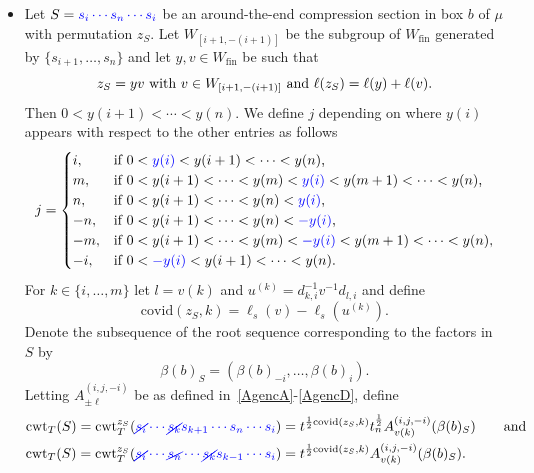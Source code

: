 \documentclass[11pt]{article}
\theoremstyle{plain}
\theoremstyle{definition}
\theoremstyle{remark}
\numberwithin{equation}{section}
\newcounter{r}
\newcounter{s}
\begin{document}
\begin{itemize}
\item[(CS1)] 
Let $S={\color{blue} s_i\cdots s_n\cdots s_{i}}$ be an around-the-end compression section in box $b$ of $\mu$ with permutation $z_S$.
Let $W_{[i+1,-(i+1)]}$ be the subgroup of $W_{\mathrm{fin}}$ generated by $\{s_{i+1}, \ldots, s_n\}$ 
and let $y,v\in W_{\mathrm{fin}}$ be such that
$$\hbox{$z_S = yv$ with $v\in W_{[i+1,-(i+1)]}$ and $\ell(z_S) = \ell(y)+\ell(v).$}$$
Then $0< y(i+1) < \cdots < y(n)$. We define $j$ depending on where $y(i)$ appears with respect to the other entries as follows
$$j = \begin{cases}
i, &\hbox{if $0<{\color{blue} y(i)} < y(i+1)<\cdots < y(n)$, } \\
m, &\hbox{if $0<y(i+1)<\cdots < y(m)  < {\color{blue} y(i) } < y(m+1) < \cdots < y(n)$,} \\
n, &\hbox{if $0<y(i+1)<\cdots  <y(n)< {\color{blue} y(i)}$,} \\
-n, &\hbox{if $0<y(i+1)<\cdots  <y(n)< {\color{blue} -y(i)}$,} \\
-m, &\hbox{if $0<y(i+1)<\cdots < y(m) < {\color{blue} -y(i)} < y(m+1) < \cdots < y(n)$,} \\
-i, &\hbox{if $0 < {\color{blue} -y(i)} < y(i+1)<\cdots <y(n)$.}
\end{cases}
$$
For $k\in \{i, \ldots, m\}$ let $l = v(k)$ and $u^{(k)} = d_{k,i}^{-1}v^{-1}d_{l,i}$ and define
$$\mathrm{covid}(z_S,k) = \ell_s(v)-\ell_s(u^{(k)}). 
$$
Denote the subsequence of the root sequence corresponding to the factors in $S$ by
$$\beta(b)_S = (\beta(b)_{-i}, \ldots, \beta(b)_i).$$
Letting $A^{(i,j,-i)}_{\pm \ell}$ be as defined in~\eqref{AgencA}-\eqref{AgencD}, define 
\begin{align}
\mathrm{cwt}_T(S) = \mathrm{cwt}^{z_S}_T({\color{blue} \cancel{s_i}\cdots\cancel{s_{k}} s_{k+1} \cdots s_n\cdots s_i})
&= t^{\frac12\mathrm{covid}(z_S,k)}t_n^{\frac12} A_{v(k)}^{(i,j,-i)}(\beta(b)_S)
\qquad\hbox{and} \nonumber \\
\mathrm{cwt}_T(S) = \mathrm{cwt}^{z_S}_T({\color{blue} \cancel{s_i}\cdots \cancel{s_n} \cdots \cancel{s_{k}} s_{k-1} \cdots s_i})
&= t^{\frac12\mathrm{covid}(z_S,k)} A_{v(k)}^{(i,j,-i)}(\beta(b)_S).
\label{CS1wt}
\end{align}


\end{itemize}
\end{document}
